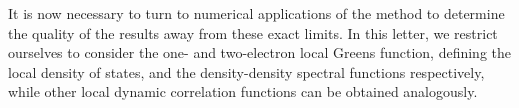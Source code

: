 \documentclass[aps,showpacs,twocolumn,nobibnotes]{revtex4}
\begin{document}
It is now necessary to turn to numerical applications of the method to determine the
quality of the results away from these exact limits. 
In this letter, we restrict ourselves to consider the one- and two-electron local Greens function,
defining the local density of states, and the density-density spectral functions respectively, while other local dynamic correlation functions can be obtained analogously.

%
\end{document}
